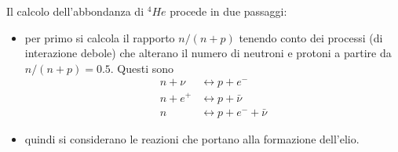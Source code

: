 Il calcolo dell'abbondanza di $^4He$ procede in due passaggi:
\begin{itemize}
\item per primo si calcola il rapporto $n/(n+p)$ tenendo conto dei processi (di
  interazione debole) che alterano il numero di neutroni e protoni a partire da
  $n/(n+p)=0.5$.  Questi sono
  \begin{subequations}
    \label{w1571}
    \begin{align}
      n + \nu  & \longleftrightarrow p  + e^-             \\
      n + e^+  & \longleftrightarrow p +        {\bar\nu} \\
      n        & \longleftrightarrow p + e^-  + {\bar\nu}
    \end{align}
  \end{subequations}
\item quindi si considerano le reazioni che portano alla formazione dell'elio.
\end{itemize}

